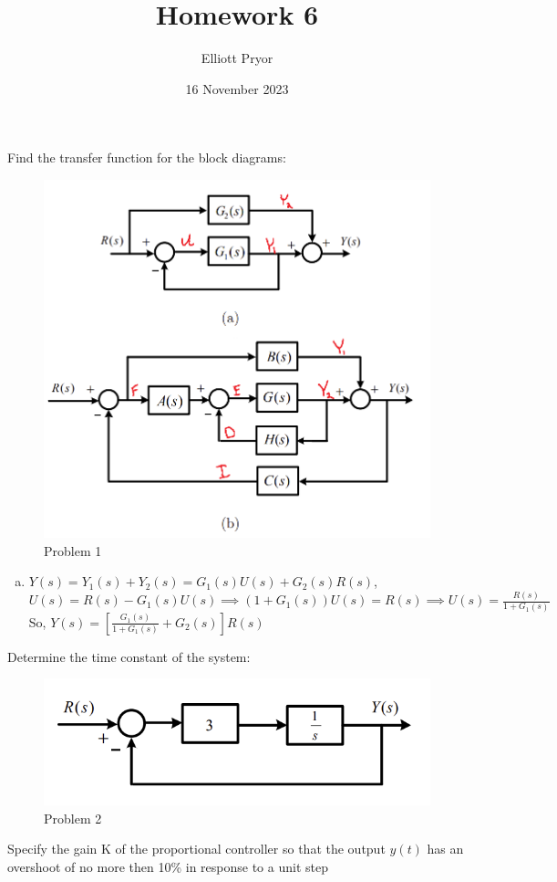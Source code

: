 \documentclass[11pt]{article}
\title{Homework 6}
\author{Elliott Pryor}
\date{16 November 2023}
\begin{document}
\maketitle

Find the transfer function for the block diagrams:
\begin{figure}[h] 
    \centering
    \includegraphics[width=0.55 \linewidth]{prob1}
    \caption{Problem 1}
    \label{fig:p1}
\end{figure}

\soln

\begin{enumerate}[a)]
    \item $Y(s) = Y_1(s) + Y_2(s) = G_1(s) U(s) + G_2(s)R(s)$,\\
    $U(s) = R(s) - G_1(s)U(s) \implies (1 + G_1(s))U(s) = R(s) \implies U(s) = \frac{R(s)}{1 + G_1(s)}$ \\
    So, $Y(s) = \left[\frac{G_1(s)}{1 + G_1(s)} + G_2(s)\right] R(s)$
\end{enumerate}



Determine the time constant of the system:
\begin{figure}[h] 
    \centering
    \includegraphics[width=0.55 \linewidth]{prob2}
    \caption{Problem 2}
    \label{fig:p2}
\end{figure}

\soln




Specify the gain K
of the proportional controller so that the output $y(t)$ has an overshoot of no more then 10\%
in response to a unit step
\end{document}
